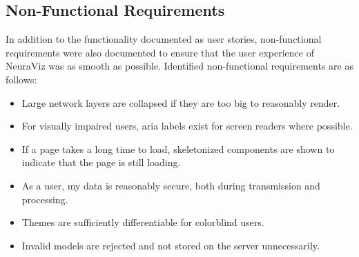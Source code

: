 \subsection{Non-Functional Requirements}
In addition to the functionality documented as user stories, non-functional requirements were also documented to ensure that the user experience of NeuraViz was as smooth as possible. Identified non-functional requirements are as follows:
\begin{itemize}
    \item Large network layers are collapsed if they are too big to reasonably render.
    \item For visually impaired users, aria labels exist for screen readers where possible.
    \item If a page takes a long time to load, skeletonized components are shown to indicate that the page is still loading.
    \item As a user, my data is reasonably secure, both during transmission and processing.
    \item Themes are sufficiently differentiable for colorblind users.
    \item Invalid models are rejected and not stored on the server unnecessarily.
\end{itemize}
